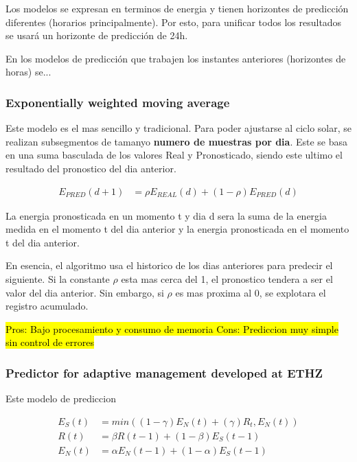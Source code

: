 Los modelos se expresan en terminos de energia y tienen horizontes de predicción diferentes (horarios principalmente). Por esto, para unificar todos los resultados se usará un horizonte de predicción de 24h.

En los modelos de predicción que trabajen los instantes anteriores (horizontes de horas) se...


\subsubsection{ Exponentially weighted moving average} 
\label{ssub:subsubsection_name}

Este modelo es el mas sencillo y tradicional. Para poder ajustarse al ciclo solar, se realizan subsegmentos de tamanyo \textbf{numero de muestras por dia}. 
Este se basa en una suma basculada de los valores Real y Pronosticado, siendo este ultimo el resultado del pronostico del dia anterior.

\begin{align}
	E_{PRED}(d+1) &= \rho E_{REAL}(d) + (1-\rho) E_{PRED}(d)
\end{align}

La energia pronosticada en un momento t y dia d sera la suma de la energia medida en el momento t del dia anterior y la energia pronosticada en el momento t del dia anterior.

En esencia, el algoritmo usa el historico de los dias anteriores para predecir el siguiente. Si la constante $\rho$ esta mas cerca del 1, el pronostico tendera a ser el valor del dia anterior. Sin embargo, si $\rho$ es mas proxima al 0, se explotara el registro acumulado. 

\hl{
Pros: Bajo procesamiento y consumo de memoria
Cons: Prediccion muy simple sin control de errores
}


\subsubsection{ Predictor for adaptive management developed at ETHZ} 
\label{ssub:subsubsection_name}

Este modelo de prediccion 

\begin{align}
	E_{S}(t) &= min( (1-\gamma) E_{N}(t) + (\gamma) R_{t}, E_N(t) ) \\
	R(t) &= \beta R(t-1) + (1-\beta) E_S(t-1) \\
	E_N(t) &= \alpha E_N(t-1) + (1-\alpha) E_S(t-1)
\end{align}

